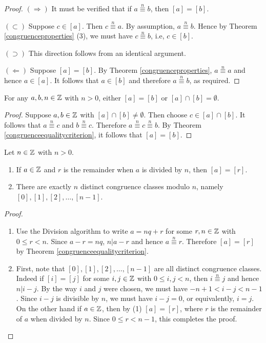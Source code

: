 \documentclass[11pt,fleqn,dvipsnames,usenames]{article}
\begin{document}
%
\begin{proof}
$(\Rightarrow)$ It must be verified that if $a\overset{n}{\equiv}b$, then $[a] = [b]$.

$(\subset)$ Suppose $c\in[a]$.  Then $c\overset{n}{\equiv}a$.  By assumption, $a\overset{n}{\equiv}b$.  Hence by Theorem \ref{congruenceproperties} (3), we must have $c\overset{n}{\equiv}b$, i.e, $c\in[b]$.

$(\supset)$ This direction follows from an identical argument.

$(\Leftarrow)$ Suppose $[a] = [b]$.  By Theorem \ref{congruenceproperties}, $a\overset{n}{\equiv}a$ and hence $a\in [a]$.  It follows that $a\in[b]$ and therefore $a\overset{n}{\equiv}b$, as required.
\end{proof}
%
\begin{corollary}\label{disjointorsame}
For any $a,b,n\in\mathbb{Z}$ with $n > 0$, either $[a] = [b]$ or $[a]\cap [b] = \emptyset$.
\end{corollary}
%
\begin{proof}
Suppose $a,b\in\mathbb{Z}$ with $[a]\cap[b]\neq\emptyset$.  Then choose $c\in[a]\cap[b]$.  It follows that $a\overset{n}{\equiv}c$ and $b\overset{n}{\equiv}c$.  Therefore $a\overset{n}{\equiv}c\overset{n}{\equiv}b$.  By Theorem \ref{congruenceequalitycriterion}, it follows that $[a] = [b]$.
\end{proof}
%
\begin{corollary}\label{elementsofZn}
Let $n\in\mathbb{Z}$ with $n>0$.
\begin{enumerate}[(1)]
\item If $a\in\mathbb{Z}$ and $r$ is the remainder when $a$ is divided by $n$, then $[a] = [r]$.
\item There are exactly $n$ distinct congruence classes modulo $n$, namely $[0], [1], [2],\ldots, [n-1]$.
\end{enumerate}
\end{corollary}
%
\begin{proof}~
\begin{enumerate}[(1)]
\item Use the Division algorithm to write $a = nq + r$ for some $r,n\in\mathbb{Z}$ with $0\leq r < n$.  Since $a - r = nq$, $n|a-r$ and hence $a\overset{n}{\equiv}r$.  Therefore $[a] = [r]$ by Theorem \ref{congruenceequalitycriterion}.
\item First, note that $[0], [1], [2],\ldots, [n-1]$ are all distinct congruence classes.  Indeed if $[i] = [j]$ for some $i,j\in\mathbb{Z}$ with $0\leq i,j < n$, then $i\overset{n}{\equiv}j$ and hence $n|i-j$.  By the way $i$ and $j$ were chosen, we must have $-n+1 < i-j < n-1$.  Since $i-j$ is divisible by $n$, we must have $i-j = 0$, or equivalently, $i=j$.  On the other hand if $a\in\mathbb{Z}$, then by (1) $[a] = [r]$, where $r$ is the remainder of $a$ when divided by $n$.  Since $0\leq r < n-1$, this completes the proof.\qedhere
\end{enumerate}
\end{proof}
\end{document}
